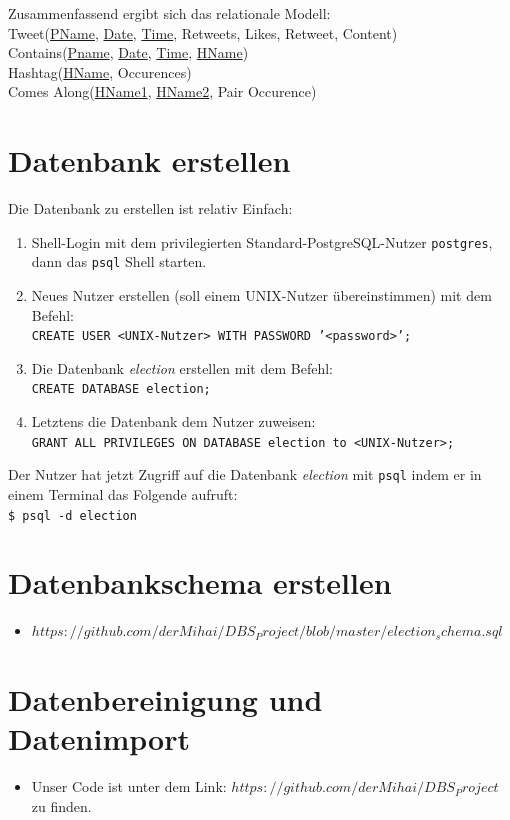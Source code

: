 \documentclass[paper=a4, english, ngerman, romanian]{scrartcl}
\begin{document}
	Zusammenfassend ergibt sich das relationale Modell: \\

	Tweet(\underline{PName}, \underline{Date}, \underline{Time}, Retweets, Likes, Retweet, Content)\\
	Contains(\underline{Pname}, \underline{Date}, \underline{Time}, \underline{HName})\\
	Hashtag(\underline{HName}, Occurences)\\
	Comes Along(\underline{HName1}, \underline{HName2}, Pair Occurence)   
	
	\section{Datenbank erstellen}
	
	Die Datenbank zu erstellen ist relativ Einfach:
	\begin{enumerate}
	\item Shell-Login mit dem privilegierten Standard-PostgreSQL-Nutzer \texttt{postgres}, dann das \texttt{psql} Shell starten.
	\item Neues Nutzer erstellen (soll einem UNIX-Nutzer übereinstimmen) mit dem Befehl: \\ 
		\texttt{CREATE USER <UNIX-Nutzer> WITH PASSWORD '<password>';}
	\item Die Datenbank \textit{election} erstellen mit dem Befehl: \\
		\texttt{CREATE DATABASE election;}
	\item Letztens die Datenbank dem Nutzer zuweisen: \\
		\texttt{GRANT ALL PRIVILEGES ON DATABASE election to <UNIX-Nutzer>;}
	\end{enumerate}
	Der Nutzer hat jetzt Zugriff auf die Datenbank \textit{election} mit \texttt{psql} indem er in einem Terminal das Folgende aufruft: \\
	\texttt{\$ psql -d election}
	
\section{Datenbankschema erstellen}

\begin{itemize}

\item $ https://github.com/derMihai/DBS_Project/blob/master/election_schema.sql $
\end{itemize}

\section{Datenbereinigung und Datenimport}

\begin{itemize}
\item Unser Code ist unter dem Link: $ https://github.com/derMihai/DBS_Project $ zu finden.
\end{itemize}
\end{document}
